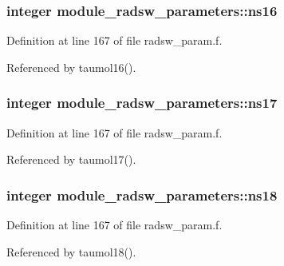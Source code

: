 \subsubsection[{\texorpdfstring{ns16}{ns16}}]{\setlength{\rightskip}{0pt plus 5cm}integer module\+\_\+radsw\+\_\+parameters\+::ns16}\hypertarget{group__module__radsw__main_ga3e6e310ecc531e2d0db52864468dc4a7}{}\label{group__module__radsw__main_ga3e6e310ecc531e2d0db52864468dc4a7}


Definition at line 167 of file radsw\+\_\+param.\+f.



Referenced by taumol16().

\subsubsection[{\texorpdfstring{ns17}{ns17}}]{\setlength{\rightskip}{0pt plus 5cm}integer module\+\_\+radsw\+\_\+parameters\+::ns17}\hypertarget{group__module__radsw__main_ga08303e69e406f6bb2af252b1b7dff272}{}\label{group__module__radsw__main_ga08303e69e406f6bb2af252b1b7dff272}


Definition at line 167 of file radsw\+\_\+param.\+f.



Referenced by taumol17().

\subsubsection[{\texorpdfstring{ns18}{ns18}}]{\setlength{\rightskip}{0pt plus 5cm}integer module\+\_\+radsw\+\_\+parameters\+::ns18}\hypertarget{group__module__radsw__main_ga142f7aa9f12272d721cfeae2855eec49}{}\label{group__module__radsw__main_ga142f7aa9f12272d721cfeae2855eec49}


Definition at line 167 of file radsw\+\_\+param.\+f.



Referenced by taumol18().


